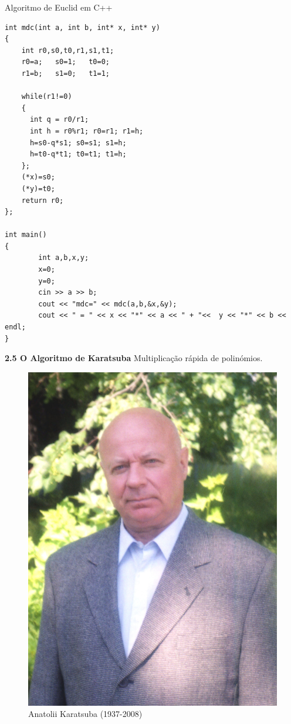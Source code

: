 \documentclass{beamer}
\begin{document}
\begin{frame}[fragile]{Algoritmo de Euclid em C++}
\lstset{language=C++,basicstyle=\tiny}
\begin{lstlisting}
int mdc(int a, int b, int* x, int* y)
{
	int r0,s0,t0,r1,s1,t1;
	r0=a;	s0=1;	t0=0;
	r1=b;	s1=0;	t1=1;
	
	while(r1!=0)
	{
	  int q = r0/r1;	  
	  int h = r0%r1; r0=r1; r1=h;
	  h=s0-q*s1; s0=s1; s1=h;
	  h=t0-q*t1; t0=t1; t1=h;
	};
	(*x)=s0;
	(*y)=t0;
	return r0;
};

int main()
{
		int a,b,x,y;
		x=0;
		y=0;
		cin >> a >> b;
		cout << "mdc=" << mdc(a,b,&x,&y);
		cout << " = " << x << "*" << a << " + "<<  y << "*" << b << endl;
}
\end{lstlisting}
\end{frame}


\begin{frame}{\bf 2.5 O Algoritmo de Karatsuba}
Multiplicação rápida de polinómios.
\begin{figure}[h]
  \begin{center}
    \includegraphics[scale=2]{Anatolii_Karatsuba.jpg}
  \end{center}

  \caption*{Anatolii Karatsuba (1937-2008)}
  \label{demTP}
\end{figure}
\end{frame}
\end{document}
